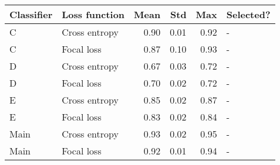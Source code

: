 \begin{tabular}{llrrrl}
\toprule
\textbf{Classifier} & \textbf{Loss function} &  \textbf{Mean} &  \textbf{Std} &  \textbf{Max} & \textbf{Selected?} \\
\midrule
                  C &          Cross entropy &           0.90 &          0.01 &          0.92 &                  - \\
                  C &             Focal loss &           0.87 &          0.10 &          0.93 &                  - \\
                  D &          Cross entropy &           0.67 &          0.03 &          0.72 &                  - \\
                  D &             Focal loss &           0.70 &          0.02 &          0.72 &                  - \\
                  E &          Cross entropy &           0.85 &          0.02 &          0.87 &                  - \\
                  E &             Focal loss &           0.83 &          0.02 &          0.84 &                  - \\
               Main &          Cross entropy &           0.93 &          0.02 &          0.95 &                  - \\
               Main &             Focal loss &           0.92 &          0.01 &          0.94 &                  - \\
\bottomrule
\end{tabular}
